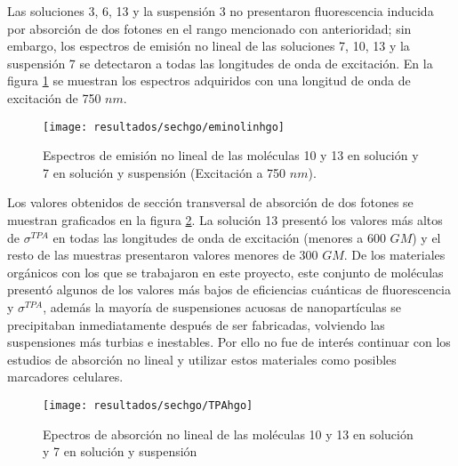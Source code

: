 Las soluciones 3, 6, 13 y la suspensi\'on 3 no presentaron fluorescencia inducida por absorci\'on de dos fotones en el rango mencionado con anterioridad; sin embargo, los espectros de emisi\'on no lineal de las soluciones 7, 10, 13 y la suspensi\'on 7 se detectaron a todas las longitudes de onda de excitaci\'on. En la figura \ref{eminlhgo} se muestran los espectros adquiridos con una longitud de onda de excitaci\'on de 750 $nm$. 

\begin{figure}[h]
\centering
\texttt{[image: resultados/sechgo/eminolinhgo]}
\caption{Espectros de emisi\'on no lineal de las mol\'eculas 10 y 13 en soluci\'on y 7 en soluci\'on y suspensi\'on (Excitaci\'on a 750 $nm$).}\label{eminlhgo}
\end{figure}

Los valores obtenidos de secci\'on transversal de absorci\'on de dos fotones se muestran graficados en la figura \ref{tpahgo}. La soluci\'on 13 present\'o los valores m\'as altos de $\sigma^{TPA}$ en todas las longitudes de onda de excitaci\'on (menores a 600 $GM$) y el resto de las muestras presentaron valores menores de 300 $GM$. De los materiales org\'anicos con los que se trabajaron en este proyecto, este conjunto de mol\'eculas present\'o algunos de los valores m\'as bajos de eficiencias cu\'anticas de fluorescencia y $\sigma^{TPA}$, adem\'as la mayor\'ia de suspensiones acuosas de nanopart\'iculas se precipitaban inmediatamente despu\'es de ser fabricadas, volviendo las suspensiones m\'as turbias e inestables. Por ello no fue de inter\'es continuar con los estudios de absorci\'on no lineal y utilizar estos materiales como posibles marcadores celulares.



\begin{figure}[H]
\centering
\texttt{[image: resultados/sechgo/TPAhgo]}
\caption{Epectros de absorci\'on no lineal de las mol\'eculas 10 y 13 en soluci\'on y 7 en soluci\'on y suspensi\'on}\label{tpahgo}
\end{figure}






